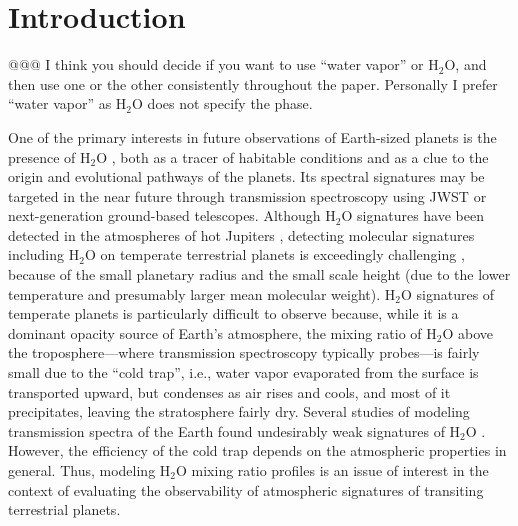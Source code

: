 \documentclass[11pt,numberedappendix,twocolappendix,]{emulateapj}
\def\water{H$_2$O }
\newcommand{\dsa}[1]{{\color{blue}#1}}
\begin{document}

\section{Introduction}
\label{s:intro}

\dsa{@@@ I think you should decide if you want to use ``water vapor'' or H$_2$O, and then use one or the other consistently throughout the paper. Personally I prefer ``water vapor'' as H$_2$O does not specify the phase.}

One of the primary interests in future observations of Earth-sized planets is the presence of \water, both as a tracer of habitable conditions and as a clue to the origin and evolutional pathways of the planets. 
Its spectral signatures may be targeted in the near future through transmission spectroscopy using JWST or next-generation ground-based telescopes.
%
Although \water signatures have been detected in the atmospheres of hot Jupiters \citep[e.g.][]{Sing2016}, detecting molecular signatures including \water on temperate terrestrial planets is exceedingly challenging \citep{Cowan2015}, 
because of the small planetary radius and the small scale height (due to the lower temperature and presumably larger mean molecular weight).  
\water signatures of temperate planets is particularly difficult to observe because, while it is a dominant opacity source of Earth's atmosphere, the mixing ratio of \water above the troposphere---where transmission spectroscopy typically probes---is fairly small due to the ``cold trap'', i.e., water vapor evaporated from the surface is transported upward, but condenses as air rises and cools, and most of it precipitates, leaving the stratosphere fairly dry. 
Several studies of modeling transmission spectra of the Earth found undesirably weak signatures of \water \citep[e.g.][]{Ehrenreich2006, Kaltenegger2009, Betremieux2013, Misra2014}. 
However, the efficiency of the cold trap depends on the atmospheric properties in general. 
Thus, modeling \water mixing ratio profiles is an issue of interest in the context of evaluating the observability of atmospheric signatures of transiting terrestrial planets. 
\end{document}
